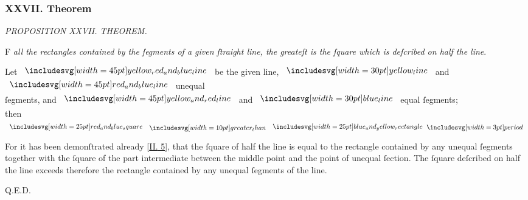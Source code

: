 \documentclass[11pt,preview]{standalone}
\begin{document}
\subsubsection{XXVII. Theorem}

\begin{minipage}[t]{0.43\textwidth}
    \vspace{20pt}
    
\end{minipage}%
\hfill
\begin{minipage}[t]{0.54\textwidth}
    \begin{center}
        \textit{PROPOSITION XXVII. THEOREM.}\label{book6pr27} \\
    \end{center}

    \hfill

    \begin{center}
        \raggedright \lettrine[lines=3, loversize=1, nindent=0pt]{}{}F \textit{all the rectangles contained by the ſegments of a given ſtraight line, the greateſt is the ſquare which is deſcribed on half the line}.
    \end{center}
\end{minipage}

\hfill

\hfill

\begin{center}
    Let $\bimg{yellow_red_and_blue_line}$ be the given line, $\yellowline$ and $\bimg{red_and_blue_line}$ unequal\\
    ſegments, and $\bimg{yellow_and_red_line}$ and $\blueline$ equal ſegments;\\
    then $\img{red_and_blue_square} \bgt \img{blue_and_yellow_rectangle} \bperiod$
\end{center}

\hfill

\raggedright For it has been demonſtrated already [\hyperref[book2pr5]{\textsc{II.} 5}], that the ſquare of half the line is equal to the rectangle contained by any unequal ſegments together with the ſquare of the part intermediate between the middle point and the point of unequal ſection. The ſquare deſcribed on half the line exceeds therefore the rectangle contained by any unequal ſegments of the line.

\hfill

\hfill Q.E.D.
\end{document}
